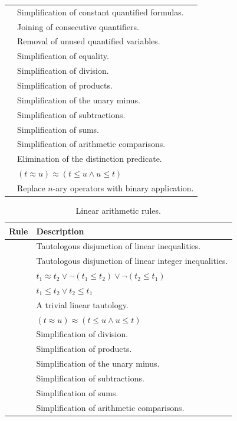 \begin{xltabular}{\linewidth}{l X}
 & Simplification of constant quantified formulas. \\
 & Joining of consecutive quantifiers. \\
 & Removal of unused quantified variables. \\
 & Simplification of equality. \\
 & Simplification of division. \\
 & Simplification of products. \\
 & Simplification of the unary minus. \\
 & Simplification of subtractions. \\
 & Simplification of sums. \\
 & Simplification of arithmetic comparisons. \\
 & Elimination of the distinction predicate. \\
 & $(t ≈ u) ≈ (t \leq u \land u \leq t)$ \\
 & Replace $n$-ary operators with binary application. \\
\end{xltabular}

\begin{xltabular}{\linewidth}{l X}
\caption{Linear arithmetic rules.}
\label{rule-tab:la-tauts}\\
	Rule & Description \\
	\hline
{} & Tautologous disjunction of linear inequalities. \\
 & Tautologous disjunction of linear integer inequalities. \\
 & $t_1 ≈ t_2 \lor \neg (t_1 \leq t_2) \lor \neg (t_2 \leq t_1)$ \\
 & $t_1 \leq t_2 \lor t_2 \leq t_1$ \\
 & A trivial linear tautology. \\
 & $(t ≈ u) ≈ (t \leq u \land u \leq t)$ \\
 & Simplification of division. \\
 & Simplification of products. \\
 & Simplification of the unary minus. \\
 & Simplification of subtractions. \\
 & Simplification of sums. \\
 & Simplification of arithmetic comparisons. \\
\end{xltabular}

